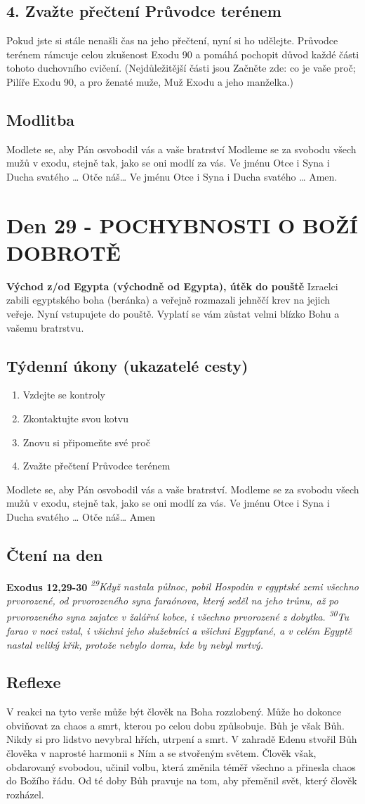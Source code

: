 \documentclass[11pt]{article}
\newcommand{\zacatekPatyTyden}{
  \textbf{Východ z/od Egypta (východně od Egypta), útěk do pouště} \newline
  Izraelci zabili egyptského boha (beránka) a veřejně rozmazali jehněčí krev na jejich veřeje. Nyní vstupujete
  do pouště. Vyplatí se vám zůstat velmi blízko Bohu a vašemu bratrstvu.

\subsection*{Týdenní úkony (ukazatelé cesty)}
\begin{enumerate}
  \item Vzdejte se kontroly
  \item Zkontaktujte svou kotvu
  \item Znovu si připomeňte své proč
  \item Zvažte přečtení Průvodce terénem
\end{enumerate}
Modlete se, aby Pán osvobodil vás a vaše bratrství. \newline
Modleme se za svobodu všech mužů v exodu, stejně tak, jako se oni modlí za vás.\newline
Ve jménu Otce i Syna i Ducha svatého …  Otče náš… Amen
}
\begin{document}
\subsection*{4. Zvažte přečtení Průvodce terénem}
Pokud jste si stále nenašli čas na jeho přečtení, nyní si ho udělejte. Průvodce terénem rámcuje celou zkušenost Exodu 90 a pomáhá pochopit důvod každé části tohoto duchovního cvičení. (Nejdůležitější části jsou Začněte zde: co je vaše proč; Pilíře Exodu 90, a pro ženaté muže, Muž Exodu a jeho manželka.)

\subsection*{Modlitba}
Modlete se, aby Pán osvobodil vás a vaše bratrství \newline
Modleme se za svobodu všech mužů v exodu, stejně tak, jako se oni modlí za vás.\newline
Ve jménu Otce i Syna i Ducha svatého … Otče náš… Ve jménu Otce i Syna i Ducha svatého … Amen.
\newpage

\newpage
\section{Den 29 - POCHYBNOSTI O BOŽÍ DOBROTĚ}
\zacatekPatyTyden
\subsection*{Čtení na den}
\textbf{Exodus 12,29-30}
\newline
\textit{
\textsuperscript{29}Když nastala půlnoc, pobil Hospodin v egyptské zemi všechno prvorozené, od prvorozeného syna faraónova, který seděl na jeho trůnu, až po prvorozeného syna zajatce v žalářní kobce, i všechno prvorozené z dobytka.
\textsuperscript{30}Tu farao v noci vstal, i všichni jeho služebníci a všichni Egypťané, a v celém Egyptě nastal veliký křik, protože nebylo domu, kde by nebyl mrtvý.
}

\subsection*{Reflexe}

V reakci na tyto verše může být člověk na Boha rozzlobený. Může ho dokonce obviňovat za chaos a smrt,
kterou po celou dobu způlsobuje. Bůh je však Bůh. Nikdy si pro lidstvo nevybral hřích, utrpení a smrt.
V zahradě Edenu stvořil Bůh člověka v naprosté harmonii s Ním a se stvořeným světem. Člověk však,
obdarovaný svobodou, učinil volbu, která změnila téměř všechno a přinesla chaos do Božího řádu. Od té
doby Bůh pravuje na tom, aby přeměnil svět, který člověk rozházel.
\end{document}
